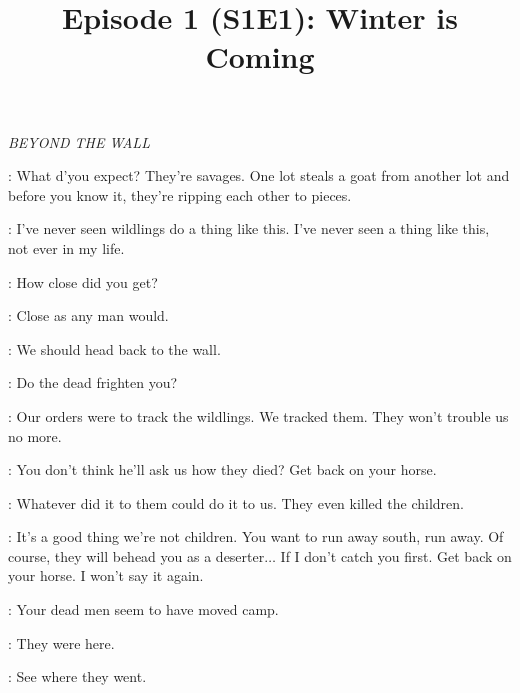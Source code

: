 

\title{Episode 1 (S1E1): Winter is Coming}
\author{}
\date{}
\maketitle




\scene

\textit{BEYOND THE WALL} 


\ROYCE: What d'you expect? They're savages. One lot steals a goat from another lot and before you know it, they're ripping each other to pieces. 

\WILL: I've never seen wildlings do a thing like this. I've never seen a thing like this, not ever in my life. 

\ROYCE: How close did you get? 

\WILL: Close as any man would. 

\GARED: We should head back to the wall. 

\ROYCE: Do the dead frighten you? 

\GARED: Our orders were to track the wildlings. We tracked them. They won't trouble us no more. 

\ROYCE: You don't think he'll ask us how they died? Get back on your horse. 

\WILL: Whatever did it to them could do it to us. They even killed the children. 

\ROYCE: It's a good thing we're not children. You want to run away south, run away. Of course, they will behead you as a deserter$\ldots$ If I don't catch you first. Get back on your horse. I won't say it again. 



\ROYCE: Your dead men seem to have moved camp. 

\WILL: They were here. 

\GARED: See where they went. 


